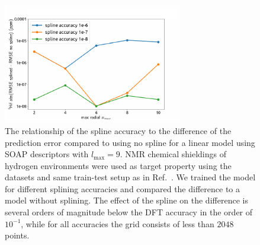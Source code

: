 
\begin{figure}
    \centering
    \includegraphics[width=0.7\textwidth]{fig/spline-accuracy-v2.pdf}
    \caption{The relationship of the spline accuracy to the difference of the prediction error compared to using no spline for a linear model using SOAP descriptors with $l_\textrm{max}=9$.
      NMR chemical shieldings of hydrogen environments were used as target property using the datasets and same train-test setup as in Ref.~\cite{paruzzo2018chemical}.
      We trained the model for different splining accuracies and compared the difference to a model without splining.
    The effect of the spline on the difference is several orders of magnitude below the DFT accuracy in the order of $10^{-1}$, while for all accuracies the grid consists of less than $2048$ points.}
    \label{fig:chemical_shift-spline}
\end{figure}


